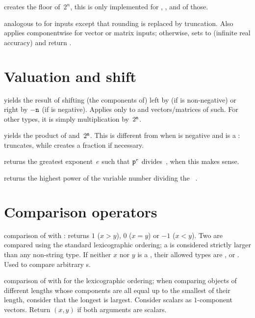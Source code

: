  creates the floor of~$2^n$, this is
only implemented for , ,  and  of
those.

 analogous to  for
 inputs except that rounding is replaced by truncation. Also applies
componentwise for vector or matrix inputs; otherwise, sets  to
 (infinite real accuracy) and return .

\section{Valuation and shift}

 yields the result of shifting
(the components of)  left by  (if  is non-negative)
or right by $-{\tt n}$ (if  is negative). Applies only to 
and vectors/matrices of such. For other types, it is simply multiplication
by~$2^{{\tt n}}$.

 yields the product of 
and~$2^{{\tt n}}$. This is different from  when  is negative
and  is a :  truncates, while 
creates a fraction if necessary.

 returns the greatest exponent~$e$ such that
${\tt p}^e$ divides~, when this makes sense.

 returns the highest power of the variable
number  dividing the ~.

\section{Comparison operators}


 comparison of  with : returns
$1$ ($x > y$), $0$ ($x = y$) or $-1$ ($x < y$). Two 
are compared using the standard lexicographic ordering; a 
is considered strictly larger than any non-string type. If neither
$x$ nor $y$ is a , their allowed types are , 
or . Used  to compare arbitrary s.

 comparison of  with  for the
lexicographic ordering; when comparing objects of different lengths whose
components are all equal up to the smallest of their length, consider that
the longest is largest. Consider scalars as $1$-component vectors. Return
$(x,y)$ if both arguments are scalars.

